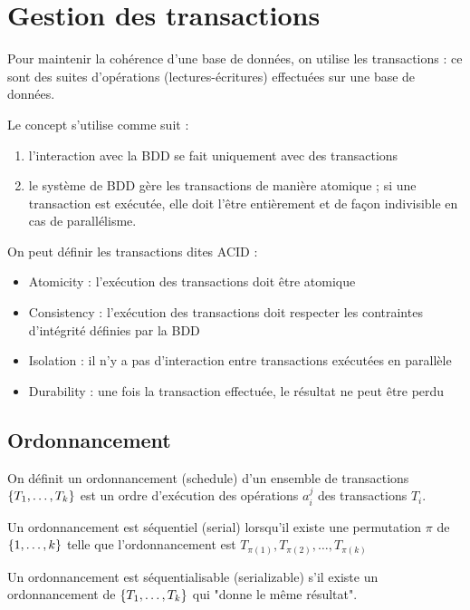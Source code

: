 \chapter{Gestion des transactions}

Pour maintenir la cohérence d'une base de données, on utilise les transactions : ce sont des suites d'opérations (lectures-écritures) effectuées sur une base de données.

Le concept s'utilise comme suit :

\begin{enumerate}
	\item l'interaction avec la BDD se fait uniquement avec des transactions
	\item le système de BDD gère les transactions de manière atomique ; si une transaction est exécutée, elle doit l'être entièrement et de façon indivisible en cas de parallélisme.
\end{enumerate}

	On peut définir les transactions dites ACID : 
	
	\begin{itemize}
		\item Atomicity : l'exécution des transactions doit être atomique
		\item Consistency : l'exécution des transactions doit respecter les contraintes d'intégrité définies par la BDD
		\item Isolation : il n'y a pas d'interaction entre transactions exécutées en parallèle
		\item Durability : une fois la transaction effectuée, le résultat ne peut être perdu
	\end{itemize}
	
	\section{Ordonnancement}
	
	On définit un ordonnancement (schedule) d'un ensemble de transactions $\lbrace T_1, \dots , T_k \rbrace$ est un ordre d'exécution des opérations $a_i^j$ des transactions $T_i$.
	
	
	Un ordonnancement est séquentiel (serial) lorsqu'il existe une permutation $\pi$ de $\lbrace 1 , \dots , k \rbrace$ telle que l'ordonnancement est $T_{\pi(1)}, T_{\pi(2)}, \dots , T_{\pi(k)}$
	
	Un ordonnancement est séquentialisable (serializable) s'il existe un ordonnancement de $\lbrace T_1, \dots , T_k \rbrace$ qui "donne le même résultat".
	
